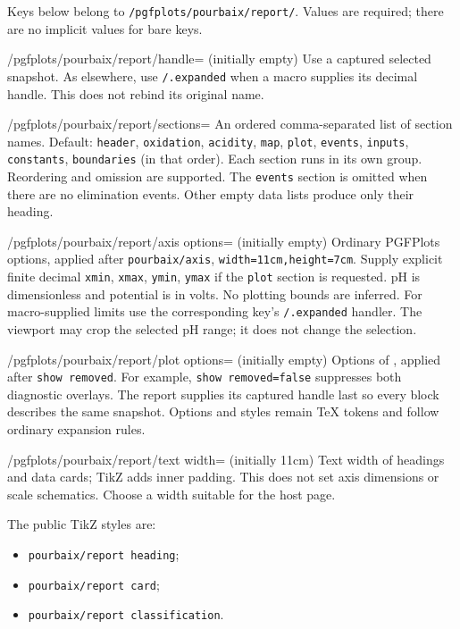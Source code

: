 \documentclass[a4paper,11pt]{ltxdoc}
\begin{document}
Keys below belong to \texttt{/pgfplots/pourbaix/report/}. Values are required;
there are no implicit values for bare keys.
\begin{key}{/pgfplots/pourbaix/report/handle= (initially empty)}
Use a captured selected snapshot. As elsewhere, use \texttt{/.expanded} when a
macro supplies its decimal handle. This does not rebind its original name.
\end{key}
\begin{key}{/pgfplots/pourbaix/report/sections=}
An ordered comma-separated list of section names. Default:
\texttt{header}, \texttt{oxidation}, \texttt{acidity}, \texttt{map},
\texttt{plot}, \texttt{events}, \texttt{inputs}, \texttt{constants},
\texttt{boundaries} (in that order).
Each section runs in its own  group. Reordering and omission are
supported. The \texttt{events} section is omitted when there are no elimination
events. Other empty data lists produce only their heading.
\end{key}
\begin{key}{/pgfplots/pourbaix/report/axis options= (initially empty)}
Ordinary PGFPlots options, applied after \texttt{pourbaix/axis},
\texttt{width=11cm,height=7cm}. Supply explicit finite decimal \texttt{xmin},
\texttt{xmax}, \texttt{ymin}, \texttt{ymax} if the \texttt{plot} section is requested.
pH is dimensionless and potential is in volts. No plotting bounds are inferred.
For macro-supplied limits use the corresponding key's \texttt{/.expanded} handler.
The viewport may crop the selected pH range; it does not change the selection.
\end{key}
\begin{key}{/pgfplots/pourbaix/report/plot options= (initially empty)}
Options of , applied after \texttt{show removed}.
For example, \texttt{show removed=false} suppresses both diagnostic overlays.
The report supplies its captured handle last so every block describes the same
snapshot. Options and styles remain TeX tokens and follow ordinary expansion rules.
\end{key}
\begin{key}{/pgfplots/pourbaix/report/text width= (initially 11cm)}
Text width of headings and data cards; TikZ adds inner padding. This does not set
axis dimensions or scale schematics. Choose a width suitable for the host page.
\end{key}
The public TikZ styles are:
\begin{itemize}
\item \texttt{pourbaix/report heading};
\item \texttt{pourbaix/report card};
\item \texttt{pourbaix/report classification}.
\end{itemize}
\end{document}
